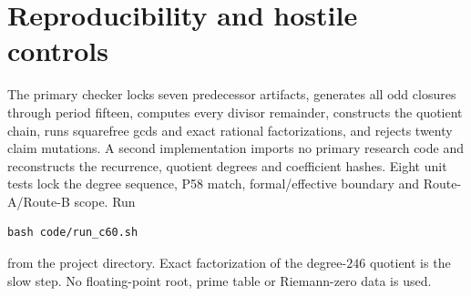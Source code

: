 \section{Reproducibility and hostile controls}

The primary checker locks seven predecessor artifacts, generates all odd
closures through period fifteen, computes every divisor remainder, constructs
the quotient chain, runs squarefree gcds and exact rational factorizations,
and rejects twenty claim mutations.  A second implementation imports no
primary research code and reconstructs the recurrence, quotient degrees and
coefficient hashes.  Eight unit tests lock the degree sequence, P58 match,
formal/effective boundary and Route-A/Route-B scope.  Run
\begin{verbatim}
bash code/run_c60.sh
\end{verbatim}
from the project directory.  Exact factorization of the degree-$246$ quotient
is the slow step.  No floating-point root, prime table or Riemann-zero data is
used.
